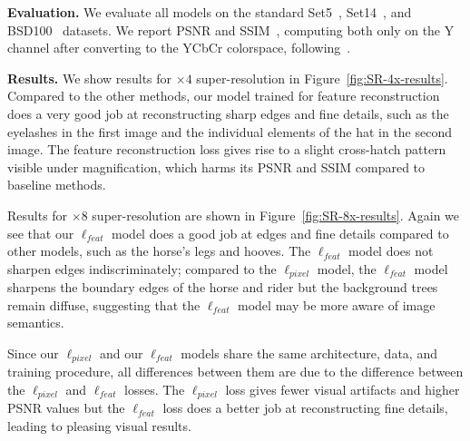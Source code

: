\documentclass[runningheads]{llncs}
\begin{document}
\vspace{1mm}
\noindent \textbf{Evaluation.}
We evaluate all models on the standard Set5~\cite{bevilacqua2012low},
Set14~\cite{zeyde2010single}, and BSD100~\cite{huang2015single} datasets. We report PSNR and
SSIM~\cite{wang2004image}, computing both only on the Y channel after converting to the YCbCr
colorspace, following~\cite{dong2015image,timofte2014adjusted}.



\vspace{1mm}
\noindent \textbf{Results.}
We show results for $\times4$ super-resolution in Figure~\ref{fig:SR-4x-results}.
Compared to the other methods, our model trained for feature reconstruction does a very good job
at reconstructing sharp edges and fine details, such as the eyelashes in the first image and the
individual elements of the hat in the second image. The feature reconstruction loss gives rise to
a slight cross-hatch pattern visible under magnification, which harms its PSNR and SSIM compared
to baseline methods.

Results for $\times8$ super-resolution are shown in Figure~\ref{fig:SR-8x-results}. Again we see that
our $\ell_{feat}$ model does a good job at edges and fine details compared to other models,
such as the horse's legs and hooves. The $\ell_{feat}$ model does not sharpen edges
indiscriminately; compared to the $\ell_{pixel}$ model, the $\ell_{feat}$ model sharpens the boundary
edges of the horse and rider but the background trees remain diffuse, suggesting that the
$\ell_{feat}$ model may be more aware of image semantics.

Since our $\ell_{pixel}$ and our $\ell_{feat}$ models share the same architecture,
data, and training procedure, all differences between them are due to the difference between the
$\ell_{pixel}$ and $\ell_{feat}$ losses. The $\ell_{pixel}$ loss gives fewer visual artifacts and
higher PSNR values but the $\ell_{feat}$ loss does a better job at reconstructing fine details, leading
to pleasing visual results.
\end{document}
